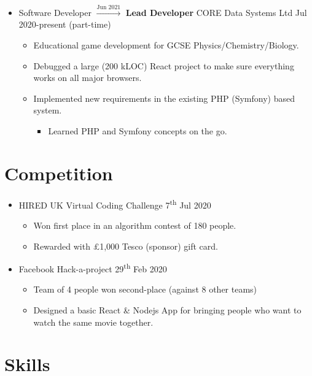   \begin{itemize}
    \item Software Developer $\xrightarrow{\text{Jun 2021}}$ \textbf{Lead Developer} \dashdiv{} CORE Data Systems Ltd \dashdiv{} Jul 2020-present (part-time)

    \begin{itemize}
      \item Educational game development for GCSE Physics/Chemistry/Biology.
      \item Debugged a large (200 kLOC) React project to make sure everything works on all major browsers.
      \item Implemented new requirements in the existing PHP (Symfony) based system.
      \begin{itemize}
        \item Learned PHP and Symfony concepts on the go.
      \end{itemize}
    \end{itemize}
  \end{itemize}

  \section{Competition}

  \begin{itemize}
    \item HIRED \dashdiv{} UK Virtual Coding Challenge \dashdiv{} 7\textsuperscript{th} Jul 2020
    \begin{itemize}
      \item Won first place in an algorithm contest of 180 people.
      \item Rewarded with £1,000 Tesco (sponsor) gift card.
    \end{itemize}
    \item Facebook \dashdiv{} Hack-a-project \dashdiv{} 29\textsuperscript{th} Feb 2020
    \begin{itemize}
      \item Team of 4 people won second-place (against 8 other teams)
      \item Designed a basic React \& Nodejs App  for bringing people who want to watch the same movie together.
    \end{itemize}
  \end{itemize}

  \section{Skills}

